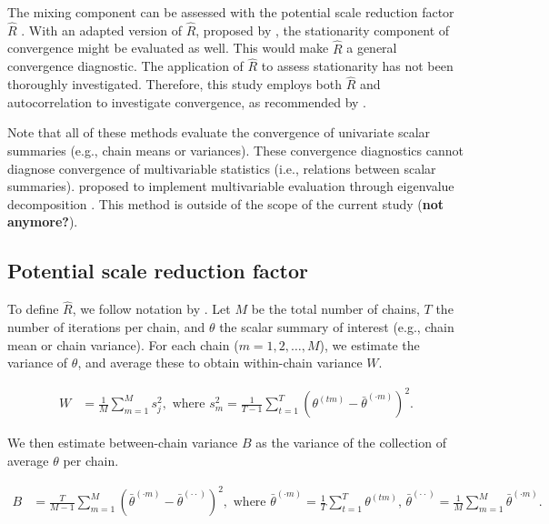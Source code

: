\documentclass[Royal,times,sageh]{sagej}
\begin{document}
The mixing component can be assessed with the potential scale reduction
factor \(\widehat{R}\) \citep[a.k.a. `Gelman-Rubin
statistic';][]{gelm92}. With an adapted version of \(\widehat{R}\),
proposed by \citet{veht19}, the stationarity component of convergence
might be evaluated as well. This would make \(\widehat{R}\) a general
convergence diagnostic. The application of \(\widehat{R}\) to assess
stationarity has not been thoroughly investigated. Therefore, this study
employs both \(\widehat{R}\) and autocorrelation to investigate
convergence, as recommended by \citep[p.~898]{cowl96}.

Note that all of these methods evaluate the convergence of univariate
scalar summaries (e.g., chain means or variances). These convergence
diagnostics cannot diagnose convergence of multivariable statistics
(i.e., relations between scalar summaries). \citet{buur18} proposed to
implement multivariable evaluation through eigenvalue decomposition
\citep{mack03}. This method is outside of the scope of the current study
(\textbf{not anymore?}).

\hypertarget{potential-scale-reduction-factor}{%
\subsection{Potential scale reduction
factor}\label{potential-scale-reduction-factor}}

To define \(\widehat{R}\), we follow notation by \citep[p.~5]{veht19}.
Let \(M\) be the total number of chains, \(T\) the number of iterations
per chain, and \(\theta\) the scalar summary of interest (e.g., chain
mean or chain variance). For each chain (\(m = 1, 2, \dots, M\)), we
estimate the variance of \(\theta\), and average these to obtain
within-chain variance \(W\).

\begin{align*}
W&=\frac{1}{M} \sum_{m=1}^{M} s_{j}^{2},  \text { where } s_{m}^{2}=\frac{1}{T-1} \sum_{t=1}^{T}\left(\theta^{(t m)}-\bar{\theta}^{(\cdot m)}\right)^{2}. 
\end{align*}

We then estimate between-chain variance \(B\) as the variance of the
collection of average \(\theta\) per chain.

\begin{align*}
B&=\frac{T}{M-1} \sum_{m=1}^{M}\left(\bar{\theta}^{(\cdot m)}-\bar{\theta}^{(\cdot \cdot)}\right)^{2}, \text { where } \bar{\theta}^{(\cdot m)}=\frac{1}{T} \sum_{t=1}^{T} \theta^{(t m)} \text{, } \bar{\theta}^{(\cdot \cdot)}=\frac{1}{M} \sum_{m=1}^{M} \bar{\theta}^{(\cdot m)}. 
\end{align*}
\end{document}
